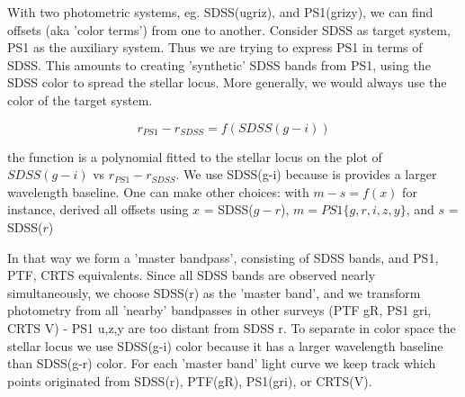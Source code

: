 \documentclass[twocolumn]{aastex62}
\begin{document}
\begin{figure*}
\caption{Regions occupied in color-color space by S82 quasars and standard stars \citep{schneider2010}. We show only 10 000  randomly chosen stars from the  full 1 mln + standard stars catalog \citealt{ivezic2007}. }
\label{fig:quasarColors}
\end{figure*} 


\begin{figure*}
\caption{The SDSS-PS1 offsets. We plot only bright stars that have SDSS(r) < 19, and that fulfill  mErr * sqrt(Nobs) < 0.03 . Each panel plots about 6000 stars of the 47000 CRTS S82 stars . Vertical dashed lines mark the region in SDSS color space occupied by quasars (see Fig.~\ref{fig:quasarColors}). }
\label{fig:offsetsPS1}
\end{figure*} 


With two photometric systems, eg. SDSS(ugriz), and PS1(grizy),  we can find offsets (aka 'color terms') from one to another. Consider SDSS as target system,  PS1 as the auxiliary system. Thus we are trying  to express PS1 in terms of SDSS. This amounts to creating 'synthetic' SDSS bands from PS1, using the SDSS color to spread the stellar locus. More generally, we would always use the color of the target system. 

\begin{equation}
r_{PS1} -  r_{SDSS} = f ( SDSS (g-i ))
\end{equation}

the function is a polynomial fitted to the stellar locus on the plot of $SDSS (g-i )$ vs $r_{PS1} -  r_{SDSS} $. We use SDSS(g-i) because is provides a larger wavelength baseline. One can make other choices: with $m - s = f(x)$  for instance, \cite{tonry2012} derived all offsets using $x$ = SDSS($g-r$), $m = PS1 \{g,r,i,z,y\}$, and $s$ = SDSS($r$)

In that way we form a 'master bandpass', consisting of SDSS bands, and PS1, PTF, CRTS equivalents.  Since all SDSS bands are observed nearly simultaneously, we choose SDSS(r) as the 'master band', and we transform photometry from all 'nearby' bandpasses in other surveys (PTF gR,  PS1 gri, CRTS V) - PS1 u,z,y are too distant from SDSS r. To separate in color space the stellar locus we use SDSS(g-i) color because it has a larger wavelength baseline than SDSS(g-r) color.  For each 'master band' light curve we keep track which points originated from SDSS(r),  PTF(gR), PS1(gri), or CRTS(V). 
\end{document}
